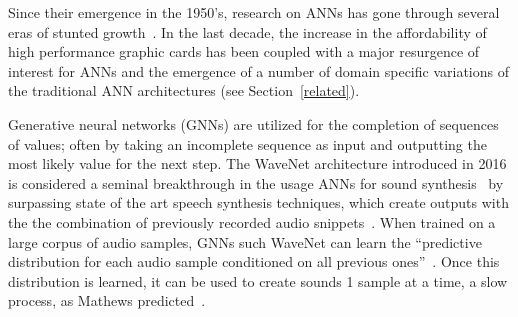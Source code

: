 \documentclass[\main/thesis.tex]{subfiles}
\begin{document}
Since their emergence in the 1950's, research on ANNs has gone through several eras of stunted growth~\cite{basheer2000artificial,anderson1988neurocomputing}.  In the last decade, the increase in the affordability of high performance graphic cards has been coupled with a major resurgence of interest for ANNs and the emergence of a number of domain specific variations of the traditional ANN architectures (see Section~\ref{related}). 

Generative neural networks (GNNs) are utilized for the completion of sequences of values; often by taking an incomplete sequence as input and outputting the most likely value for the next step. The WaveNet architecture introduced in 2016 is considered a seminal breakthrough in the usage ANNs for sound synthesis~\cite{oord2016wavenet} by surpassing state of the art speech synthesis techniques, which create outputs with the the combination of previously recorded audio snippets~\cite{schwarz2007corpus}. When trained on a large corpus of audio samples, GNNs such WaveNet can learn the \enquote{predictive distribution for each
audio sample conditioned on all previous ones}~\cite{oord2016wavenet}. Once this distribution is learned, it can be used to create sounds 1 sample at a time, a slow process, as Mathews predicted~\cite{mathews1963digital}. \\




\end{document}
